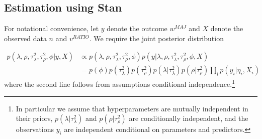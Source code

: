 %
%



\subsection{Estimation using Stan}

For notational convenience, let $y$ denote the outcome $w^{MAJ}$ and $X$ denote the observed data $n$ and $v^{RATIO}$. We require the joint posterior distribution

{\singlespacing
\begin{align*}
p(\lambda, \rho, \tau^2_\lambda, \tau^2_\rho, \phi | y, X) & \propto p(\lambda, \rho, \tau^2_\lambda, \tau^2_\rho, \phi) p(y | \lambda, \rho, \tau^2_\lambda, \tau^2_\rho, \phi,  X)  \\
& = p(\phi) p(\tau^2_\lambda) p(\tau^2_\rho)  p(\lambda | \tau^2_\lambda) p(\rho | \tau^2_\rho) \prod_i p(y_i | \eta_i, X_i) 
\end{align*}
}
%
\noindent where the second line follows from assumptions conditional independence.\footnote{In particular we assume that hyperparameters are mutually independent in their priors, $p(\lambda | \tau^2_\lambda)$ and $p(\rho | \tau^2_\rho)$ are conditionally independent, and the observations $y_i$ are independent conditional on parameters and predictors.}

